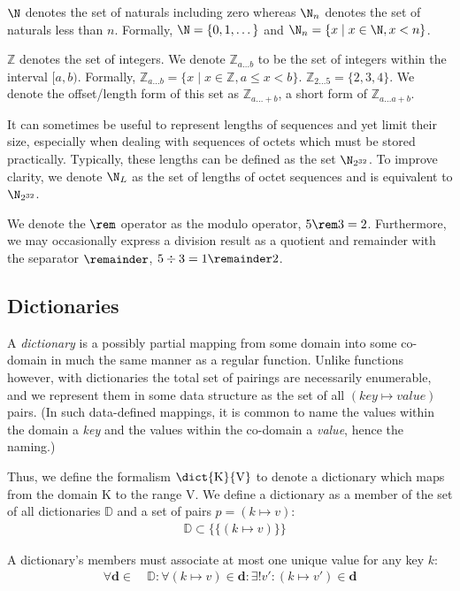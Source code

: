 $\N$ denotes the set of naturals including zero whereas $\N_n$ denotes the set of naturals less than $n$. Formally, $\N = \{0, 1, \dots \}$ and $\N_n = \{ x \mid x \in \N, x < n \}$.

$\mathbb{Z}$ denotes the set of integers. We denote $\mathbb{Z}_{a \dots b}$ to be the set of integers within the interval $[a, b)$. Formally, $\mathbb{Z}_{a \dots b} = \{ x \mid x \in \mathbb{Z}, a \le x < b \}$. \Eg $\mathbb{Z}_{2 \dots 5} = \{ 2, 3, 4 \}$. We denote the offset/length form of this set as $\mathbb{Z}_{a \dots +b}$, a short form of $\mathbb{Z}_{a \dots a+b}$.

It can sometimes be useful to represent lengths of sequences and yet limit their size, especially when dealing with sequences of octets which must be stored practically. Typically, these lengths can be defined as the set $\N_{2^{32}}$. To improve clarity, we denote $\N_L$ as the set of lengths of octet sequences and is equivalent to $\N_{2^{32}}$.

We denote the $\rem$ operator as the modulo operator, \eg $5 \rem 3 = 2$. Furthermore, we may occasionally express a division result as a quotient and remainder with the separator $\remainder$, \eg $5 \div 3 = 1 \remainder 2$.

\subsection{Dictionaries}\label{sec:dictionaries}

A \emph{dictionary} is a possibly partial mapping from some domain into some co-domain in much the same manner as a regular function. Unlike functions however, with dictionaries the total set of pairings are necessarily enumerable, and we represent them in some data structure as the set of all $(key \mapsto value)$ pairs. (In such data-defined mappings, it is common to name the values within the domain a \emph{key} and the values within the co-domain a \emph{value}, hence the naming.)

Thus, we define the formalism $\dict{\mathrm{K}}{\mathrm{V}}$ to denote a dictionary which maps from the domain $\mathrm{K}$ to the range $\mathrm{V}$. We define a dictionary as a member of the set of all dictionaries $\mathbb{D}$ and a set of pairs $p = (k \mapsto v)$:
\begin{align}
  &\mathbb{D} \subset \big \{ \{ (k \mapsto v) \} \big \}
\end{align}

A dictionary's members must associate at most one unique value for any key $k$:
\begin{align}
  \forall \mathbf{d} \in\ &\mathbb{D} : \forall (k \mapsto v) \in \mathbf{d} : \exists! v' : (k \mapsto v') \in \mathbf{d}
\end{align}

